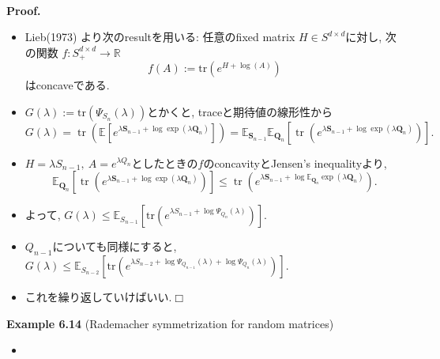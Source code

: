 \documentclass[unicode,aspectratio=169,11pt]{beamer}
\def\qed{\hfill $\Box$}
\newcommand{\ex}{\mathbb{E}}
\newcommand{\bb}{\mathbb}
\newcommand{\trace}{\mathrm{tr}}
\begin{document}
\begin{frame}{}{}
  　\\
{\bf Proof.}
\begin{itemize}
  \item Lieb(1973) より次のresultを用いる: 任意のfixed matrix $H \in S^{d\times d}$に対し, 次の関数 $f : S^{d\times d}_+ \to \bb{R}$
        \[ f(A) := \trace(e^{H + \log(A)}) \]
        はconcaveである.
  \item $G(\lambda) := \trace(\Psi_{S_n}(\lambda))$とかくと, traceと期待値の線形性から
        \[
          G(\lambda)
          =\operatorname{tr}\left(\mathbb{E}\left[e^{\lambda \mathbf{S}_{n-1}+\log \exp \left(\lambda \mathbf{Q}_{n}\right)}\right]\right)
          =\mathbb{E}_{\mathbf{S}_{n-1}} \mathbb{E}_{\mathbf{Q}_{n}}\left[\operatorname{tr}\left(e^{\lambda \mathbf{S}_{n-1}+\log \exp \left(\lambda \mathbf{Q}_{n}\right)}\right)
          \right].
        \]
  \item $H = \lambda S_{n-1},\ A = e^{\lambda Q_n}$としたときの$f$のconcavityとJensen's inequalityより,
        \[
          \mathbb{E}_{\mathbf{Q}_{n}}\left[\operatorname{tr}\left(e^{\lambda \mathbf{S}_{n-1}+\log \exp \left(\lambda \mathbf{Q}_{n}\right)}\right)\right] \leq \operatorname{tr}\left(e^{\lambda \mathbf{S}_{n-1}+\log \mathbb{E}_{\mathbf{Q}_{n}} \exp \left(\lambda \mathbf{Q}_{n}\right)}\right).
        \]
  \item よって, $G(\lambda) \le \ex_{S_{n-1}}[\trace (e^{\lambda S_{n-1} + \log \Psi_{Q_n}(\lambda)})]$.
  \item $Q_{n-1}$についても同様にすると, $G(\lambda) \le \ex_{S_{n-2}}[\trace (e^{\lambda S_{n-2} + \log \Psi_{Q_{n-1}}(\lambda) + \log \Psi_{Q_n}(\lambda)})]$.
  \item これを繰り返していけばいい.\qed
\end{itemize}
\end{frame}

\begin{frame}{}{}
  {\bf Example 6.14} (Rademacher symmetrization for random matrices)
  \begin{itemize}
    \item 
  \end{itemize}
\end{frame}
\end{document}
